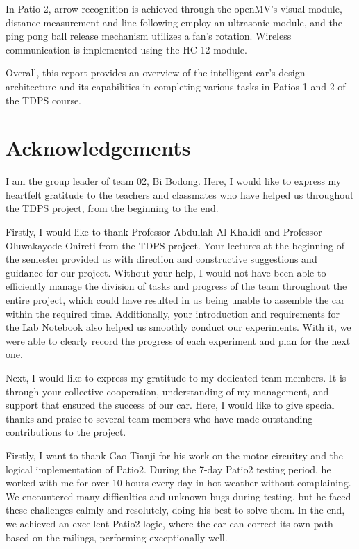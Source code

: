 \documentclass[12pt, a4paper, oneside]{report}
\begin{document}
In Patio 2, arrow recognition is achieved through the openMV's visual module, distance measurement and line following employ an ultrasonic module, and the ping pong ball release mechanism utilizes a fan's rotation. Wireless communication is implemented using the HC-12 module.

Overall, this report provides an overview of the intelligent car's design architecture and its capabilities in completing various tasks in Patios 1 and 2 of the TDPS course.
\newpage
\section*{Acknowledgements}
I am the group leader of team 02, Bi Bodong. Here, I would like to express my heartfelt gratitude to the teachers and classmates who have helped us throughout the TDPS project, from the beginning to the end.

Firstly, I would like to thank Professor Abdullah Al-Khalidi and Professor Oluwakayode Onireti from the TDPS project. Your lectures at the beginning of the semester provided us with direction and constructive suggestions and guidance for our project. Without your help, I would not have been able to efficiently manage the division of tasks and progress of the team throughout the entire project, which could have resulted in us being unable to assemble the car within the required time. Additionally, your introduction and requirements for the Lab Notebook also helped us smoothly conduct our experiments. With it, we were able to clearly record the progress of each experiment and plan for the next one.

Next, I would like to express my gratitude to my dedicated team members. It is through your collective cooperation, understanding of my management, and support that ensured the success of our car. Here, I would like to give special thanks and praise to several team members who have made outstanding contributions to the project.

Firstly, I want to thank Gao Tianji for his work on the motor circuitry and the logical implementation of Patio2. During the 7-day Patio2 testing period, he worked with me for over 10 hours every day in hot weather without complaining. We encountered many difficulties and unknown bugs during testing, but he faced these challenges calmly and resolutely, doing his best to solve them. In the end, we achieved an excellent Patio2 logic, where the car can correct its own path based on the railings, performing exceptionally well.
\end{document}

